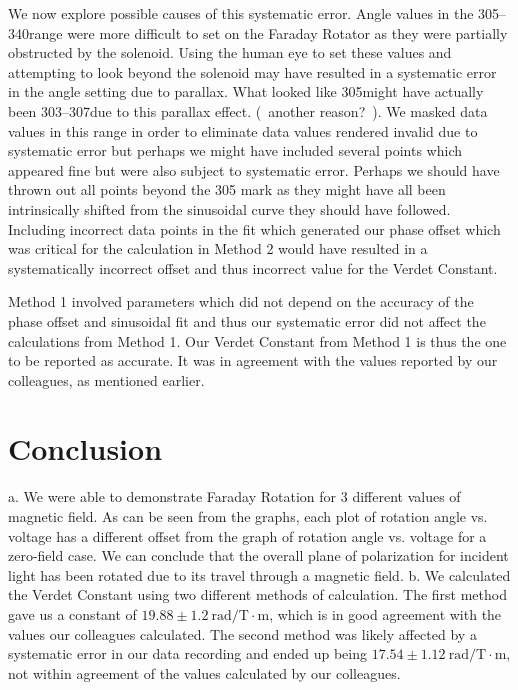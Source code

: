 \documentclass[prb,preprint]{revtex4-1}
\begin{document}
{{{{{{We now explore possible causes of this systematic error.  Angle values in the 305\degree--340\degree range were more difficult to set on the Faraday Rotator as they were partially obstructed by the solenoid.  Using the human eye to set these values and attempting to look beyond the solenoid may have resulted in a systematic error in the angle setting due to parallax.  What looked like 305\degree might have actually been 303\degree--307\degree due to this parallax effect.  (~another reason?~).  We masked data values in this range in order to eliminate data values rendered invalid due to systematic error but perhaps we might have included several points which appeared fine but were also subject to systematic error.  Perhaps we should have thrown out all points beyond the 305 \degree mark as they might have all been intrinsically shifted from the sinusoidal curve they should have followed.  Including incorrect data points in the fit which generated our phase offset which was critical for the calculation in Method 2 would have resulted in a systematically incorrect offset and thus incorrect value for the Verdet Constant.

Method 1 involved parameters which did not depend on the accuracy of the phase offset and sinusoidal fit and thus our systematic error did not affect the calculations from Method 1.  Our Verdet Constant from Method 1 is thus the one to be reported as accurate.  It was in agreement with the values reported by our colleagues, as mentioned earlier.

\section{Conclusion}
{a.  We were able to demonstrate Faraday Rotation for 3 different values of magnetic field.  As can be seen from the graphs, each plot of rotation angle vs. voltage has a different offset from the graph of rotation angle vs. voltage for a zero-field case.  We can conclude that the overall plane of polarization for incident light has been rotated due to its travel through a magnetic field.
b.  We calculated the Verdet Constant using two different methods of calculation.  The first method gave us a constant of $19.88 \pm 1.2 \mathrm{~rad/T} \cdot \textrm{m}$, which is in good agreement with the values our colleagues calculated.  The second method was likely affected by a systematic error in our data recording and ended up being $17.54 \pm 1.12 \mathrm{~rad/T} \cdot \textrm{m}$, not within agreement of the values calculated by our colleagues.

}}}}}}}
\end{document}
